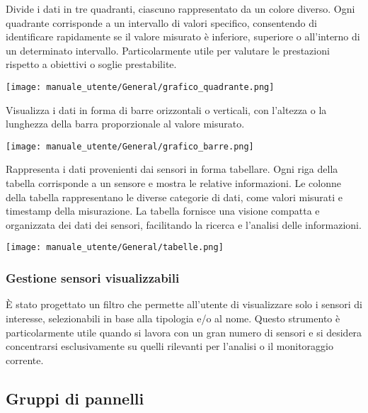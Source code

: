 Divide i dati in tre quadranti, ciascuno rappresentato da un colore diverso. Ogni quadrante corrisponde a un intervallo di valori specifico, consentendo di identificare rapidamente se il valore misurato è inferiore, superiore o all'interno di un determinato intervallo. Particolarmente utile per valutare le prestazioni rispetto a obiettivi o soglie prestabilite.
\begin{center}
    \texttt{[image: manuale\_utente/General/grafico\_quadrante.png]}
\end{center}

Visualizza i dati in forma di barre orizzontali o verticali, con l'altezza o la lunghezza della barra proporzionale al valore misurato. 
\begin{center}
    \texttt{[image: manuale\_utente/General/grafico\_barre.png]}
\end{center}

Rappresenta i dati provenienti dai sensori in forma tabellare. Ogni riga della tabella corrisponde a un sensore e mostra le relative informazioni. Le colonne della tabella rappresentano le diverse categorie di dati, come valori misurati e timestamp della misurazione. La tabella fornisce una visione compatta e organizzata dei dati dei sensori, facilitando la ricerca e l'analisi delle informazioni.
\begin{center}
    \texttt{[image: manuale\_utente/General/tabelle.png]}
\end{center} 


\subsubsection{Gestione sensori visualizzabili}
È stato progettato un filtro che permette all'utente di visualizzare solo i sensori di interesse, selezionabili in base alla tipologia e/o al nome. Questo strumento è particolarmente utile quando si lavora con un gran numero di sensori e si desidera concentrarsi esclusivamente su quelli rilevanti per l'analisi o il monitoraggio corrente.
\newpage
\subsection{Gruppi di pannelli}
